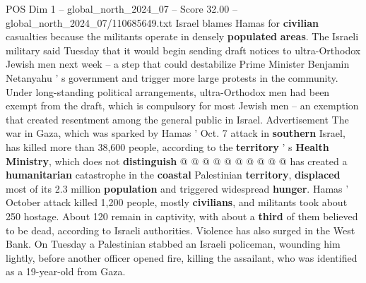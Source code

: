 \begin{textsample}{POS Dim 1 – global\_north\_2024\_07 – Score 32.00 – global\_north\_2024\_07/110685649.txt}
Israel blames Hamas for \textbf{civilian} casualties because the militants operate in densely \textbf{populated} \textbf{areas}.
The Israeli military said Tuesday that it would begin sending draft notices to ultra-Orthodox Jewish men next week -- a step that could destabilize Prime Minister Benjamin Netanyahu ' s government and trigger more large protests in the community.
Under long-standing political arrangements, ultra-Orthodox men had been exempt from the draft, which is compulsory for most Jewish men -- an exemption that created resentment among the general public in Israel.
Advertisement The war in Gaza, which was sparked by Hamas ' Oct. 7 attack in \textbf{southern} Israel, has killed more than 38,600 people, according to the \textbf{territory} ' s \textbf{Health} \textbf{Ministry}, which does not \textbf{distinguish} @ @ @ @ @ @ @ @ @ @ has created a \textbf{humanitarian} catastrophe in the \textbf{coastal} Palestinian \textbf{territory}, \textbf{displaced} most of its 2.3 million \textbf{population} and triggered widespread \textbf{hunger}.
Hamas ' October attack killed 1,200 people, mostly \textbf{civilians}, and militants took about 250 hostage.
About 120 remain in captivity, with about a \textbf{third} of them believed to be dead, according to Israeli authorities.
Violence has also surged in the West Bank.
On Tuesday a Palestinian stabbed an Israeli policeman, wounding him lightly, before another officer opened fire, killing the assailant, who was identified as a 19-year-old from Gaza.

\end{textsample}
